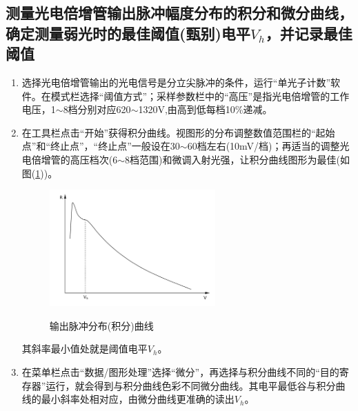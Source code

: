 \documentclass[a4paper]{article}
\begin{document}
\subsection{测量光电倍增管输出脉冲幅度分布的积分和微分曲线，确定测量弱光时的最佳阈值(甄别)电平$V_h$，并记录最佳阈值}
\begin{enumerate}
\item 选择光电倍增管输出的光电信号是分立尖脉冲的条件，运行“单光子计数”软件。在模式栏选择“阈值方式”；采样参数栏中的“高压”是指光电倍增管的工作电压，1$\sim$8档分别对应620$\sim$1320V,由高到低每档10\%递减。
\item 在工具栏点击“开始”获得积分曲线。视图形的分布调整数值范围栏的“起始点”和“终止点”，“终止点”一般设在30$\sim$60档左右(10mV/档)；再适当的调整光电倍增管的高压档次(6$\sim$8档范围)和微调入射光强，让积分曲线图形为最佳(如图(\ref{fig12}))。
\begin{figure}[!h]
\centering
\includegraphics[width=0.6\textwidth]{fig/fig12.pdf}\\
\caption{输出脉冲分布(积分)曲线}\label{fig12}
\end{figure}

其斜率最小值处就是阈值电平$V_h$。
\item 在菜单栏点击“数据/图形处理”选择“微分”，再选择与积分曲线不同的“目的寄存器”运行，就会得到与积分曲线色彩不同微分曲线。其电平最低谷与积分曲线的最小斜率处相对应，由微分曲线更准确的读出$V_h$。
\end{enumerate}
\end{document}
